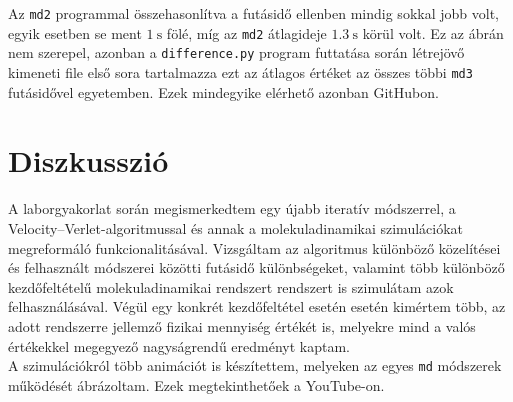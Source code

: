 \begin{multicols}{2}
Az \texttt{md2} programmal összehasonlítva a futásidő ellenben mindig sokkal jobb volt, egyik esetben se ment $1\ \text{s}$ fölé, míg az \texttt{md2} átlagideje $1.3\ \text{s}$ körül volt. Ez az ábrán nem szerepel, azonban a \texttt{difference.py} program futtatása során létrejövő kimeneti file első sora tartalmazza ezt az átlagos értéket az összes többi \texttt{md3} futásidővel egyetemben. Ezek mindegyike elérhető azonban GitHubon\cite{github}.

\section{Diszkusszió} \label{sec:7}
A laborgyakorlat során megismerkedtem egy újabb iteratív módszerrel, a Velocity--Verlet-algoritmussal és annak a molekuladinamikai szimulációkat megreformáló funkcionalitásával. Vizsgáltam az algoritmus különböző közelítései és felhasznált módszerei közötti futásidő különbségeket, valamint több különböző kezdőfeltételű molekuladinamikai rendszert rendszert is szimulátam azok felhasználásával. Végül egy konkrét kezdőfeltétel esetén esetén kimértem több, az adott rendszerre jellemző fizikai mennyiség értékét is, melyekre mind a valós értékekkel megegyező nagyságrendű eredményt kaptam. \\
A szimulációkról több animációt is készítettem, melyeken az egyes \texttt{md} módszerek működését ábrázoltam. Ezek megtekinthetőek a YouTube-on\cite{yt}.

\end{multicols}